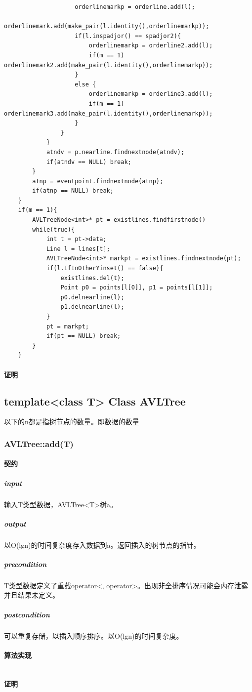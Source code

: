 \documentclass[a4paper]{book}
\numberwithin{equation}{chapter}
\theoremstyle{definition}
\begin{document}
\begin{lstlisting}
					orderlinemarkp = orderline.add(l);
					orderlinemark.add(make_pair(l.identity(),orderlinemarkp));
					if(l.inspadjor() == spadjor2){
						orderlinemarkp = orderline2.add(l);
						if(m == 1) orderlinemark2.add(make_pair(l.identity(),orderlinemarkp));
					}
					else {
						orderlinemarkp = orderline3.add(l);
						if(m == 1) orderlinemark3.add(make_pair(l.identity(),orderlinemarkp));
					}
				}
			}	
			atndv = p.nearline.findnextnode(atndv);	
			if(atndv == NULL) break;
		}
		atnp = eventpoint.findnextnode(atnp);
		if(atnp == NULL) break;
	}
	if(m == 1){
		AVLTreeNode<int>* pt = existlines.findfirstnode()
		while(true){
			int t = pt->data;
			Line l = lines[t];
			AVLTreeNode<int>* markpt = existlines.findnextnode(pt);
			if(l.IfInOtherYinset() == false){
				existlines.del(t);
				Point p0 = points[l[0]], p1 = points[l[1]];
				p0.delnearline(l);
				p1.delnearline(l);
			}
			pt = markpt;
			if(pt == NULL) break;
		}
	}
\end{lstlisting}
\paragraph{证明}


\subsection{template<class T> Class AVLTree}
以下的n都是指树节点的数量。即数据的数量
\subsubsection{AVLTree::add(T)}
\paragraph{契约}
\subparagraph{input}
输入T类型数据，AVLTree<T>树a。
\subparagraph{output}
以O(lgn)的时间复杂度存入数据到a。返回插入的树节点的指针。
\subparagraph{precondition}
T类型数据定义了重载operator<, operator>。出现非全排序情况可能会内存泄露并且结果未定义。
\subparagraph{postcondition}
可以重复存储，以插入顺序排序。以O(lgn)的时间复杂度。
\paragraph{算法实现}
\begin{lstlisting}
\end{lstlisting}
\paragraph{证明}
\end{document}
